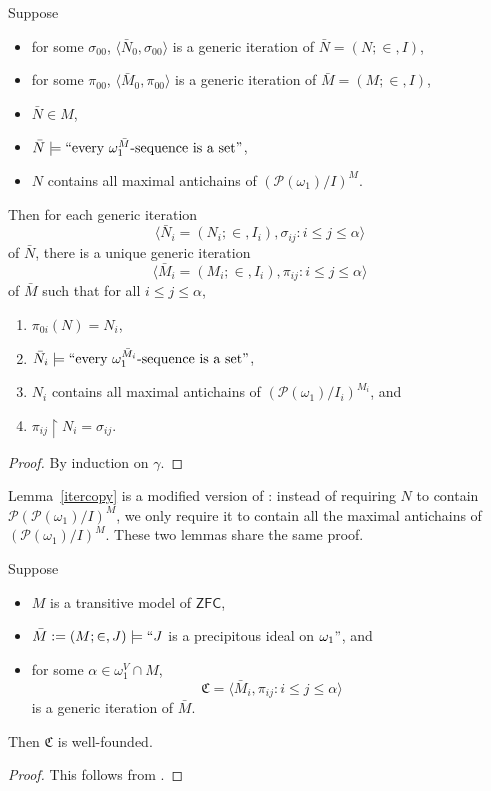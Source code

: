 \documentclass[12pt]{article}
\numberwithin{equation}{section}
\begin{document}
\begin{lem}\label{itercopy}
Suppose 
\begin{itemize}
    \item for some $\sigma_{00}$, $\langle \bar{N}_0, \sigma_{00} \rangle$ is a generic iteration of $\bar{N} = (N; \in, I)$,
    \item for some $\pi_{00}$, $\langle \bar{M}_0, \pi_{00} \rangle$ is a generic iteration of $\bar{M} = (M; \in, I)$,
    \item $\bar{N} \in M$,
    \item $\bar{N} \models ``\text{every } {\omega_1^{\bar{M}}} \text{-sequence is a set}"$,
    \item $N$ contains all maximal antichains of $(\mathcal{P}(\omega_1) / I)^{M}$.
\end{itemize}
Then for each generic iteration $$\langle \bar{N}_i = (N_i; \in, I_i), \sigma_{ij} : i \leq j \leq \alpha \rangle$$ of $\bar{N}$, there is a unique generic iteration $$\langle \bar{M}_i = (M_i; \in, I_i), \pi_{ij} : i \leq j \leq \alpha \rangle$$ of $\bar{M}$ such that for all $i \leq j \leq \alpha$,
\begin{enumerate}[label=(\alph*)]
    \item $\pi_{0i}(N) = N_i$,
    \item $\bar{N}_i \models ``\text{every } {\omega_1^{\bar{M}_i}} \text{-sequence is a set}"$,
    \item $N_i$ contains all maximal antichains of $(\mathcal{P}(\omega_1) / I_i)^{M_i}$, and
    \item $\pi_{ij} \restriction N_i = \sigma_{ij}$.
\end{enumerate}
\end{lem}
\begin{proof}
By induction on $\gamma$.
\end{proof}

Lemma~\ref{itercopy} is a modified version of \cite[Lemma 1.5]{larson}: instead of requiring $N$ to contain $\mathcal{P}(\mathcal{P}(\omega_1) / I)^{M}$, we only require it to contain all the maximal antichains of $(\mathcal{P}(\omega_1) / I)^{M}$. These two lemmas share the same proof.

\begin{lem}\label{iterlength}
Suppose
\begin{itemize}
    \item $M$ is a transitive model of $\mathsf{ZFC}$,
    \item $\bar{M} := (M; \in, J) \models ``J$ is a precipitous ideal on $\omega_1"$, and
    \item for some $\alpha \in \omega_1^V \cap M$, $$\mathfrak{C} = \langle \bar{M}_i, \pi_{ij} : i \leq j \leq \alpha \rangle$$ is a generic iteration of $\bar{M}$.
\end{itemize}
Then $\mathfrak{C}$ is well-founded.
\end{lem}
\begin{proof}
This follows from \cite[Lemma 1.6]{larson}.
\end{proof}
\end{document}

